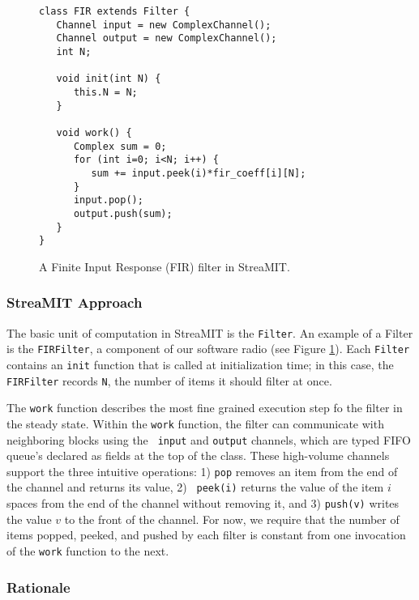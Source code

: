 \begin{figure}
\scriptsize
\begin{verbatim}
class FIR extends Filter {
   Channel input = new ComplexChannel();
   Channel output = new ComplexChannel();           
   int N;

   void init(int N) {
      this.N = N;
   }

   void work() {
      Complex sum = 0;
      for (int i=0; i<N; i++) {
         sum += input.peek(i)*fir_coeff[i][N];
      }
      input.pop();
      output.push(sum);
   }
}
\end{verbatim}
\vspace{-12pt}
\caption{\protect\small A Finite Input Response (FIR) filter in StreaMIT.
\protect\label{fig:firfilter}}
\vspace{-12pt}
\end{figure}

\subsubsection{StreaMIT Approach}

The basic unit of computation in StreaMIT is the {\tt Filter}.  An
example of a Filter is the {\tt FIRFilter}, a component of our
software radio (see Figure \ref{fig:firfilter}).  Each {\tt Filter}
contains an {\tt init} function that is called at initialization time;
in this case, the {\tt FIRFilter} records {\tt N}, the number of items
it should filter at once.

The {\tt work} function describes the most fine grained execution step
fo the filter in the steady state.  Within the {\tt work} function,
the filter can communicate with neighboring blocks using the {\tt
input} and {\tt output} channels, which are typed FIFO queue's
declared as fields at the top of the class.  These high-volume
channels support the three intuitive operations: 1) {\tt pop} removes
an item from the end of the channel and returns its value, 2) {\tt
peek(i)} returns the value of the item $i$ spaces from the end of the
channel without removing it, and 3) {\tt push(v)} writes the value $v$
to the front of the channel.  For now, we require that the number of
items popped, peeked, and pushed by each filter is constant from one
invocation of the {\tt work} function to the next.

\subsubsection{Rationale}

